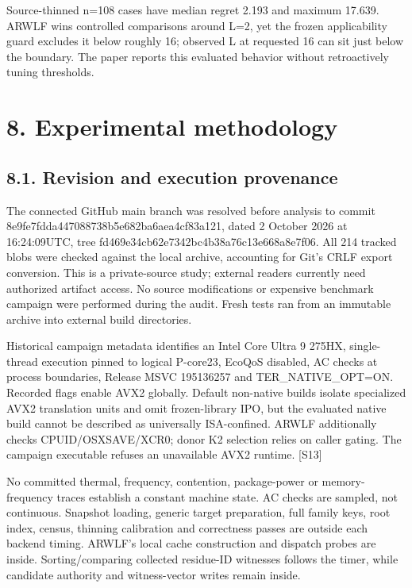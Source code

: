 \documentclass[10pt,letterpaper]{article}
\begin{document}
Source-thinned n=108 cases have median regret 2.193 and maximum 17.639. ARWLF wins controlled comparisons around L=2, yet the frozen applicability guard excludes it below roughly 16; observed L at requested 16 can sit just below the boundary. The paper reports this evaluated behavior without retroactively tuning thresholds.


\section*{8. Experimental methodology}

\subsection*{8.1. Revision and execution provenance}

The connected GitHub main branch was resolved before analysis to commit 8e9fe7fdda447088738b5e682ba6aea4cf83a121, dated 2 October 2026 at 16:24:09UTC, tree fd469e34cb62e7342bc4b38a76c13e668a8e7f06. All 214 tracked blobs were checked against the local archive, accounting for Git's CRLF export conversion. This is a private-source study; external readers currently need authorized artifact access. No source modifications or expensive benchmark campaign were performed during the audit. Fresh tests ran from an immutable archive into external build directories.


Historical campaign metadata identifies an Intel Core Ultra 9 275HX, single-thread execution pinned to logical P-core23, EcoQoS disabled, AC checks at process boundaries, Release MSVC 195136257 and TER\_NATIVE\_OPT=ON. Recorded flags enable AVX2 globally. Default non-native builds isolate specialized AVX2 translation units and omit frozen-library IPO, but the evaluated native build cannot be described as universally ISA-confined. ARWLF additionally checks CPUID/OSXSAVE/XCR0; donor K2 selection relies on caller gating. The campaign executable refuses an unavailable AVX2 runtime. [S13]


No committed thermal, frequency, contention, package-power or memory-frequency traces establish a constant machine state. AC checks are sampled, not continuous. Snapshot loading, generic target preparation, full family keys, root index, census, thinning calibration and correctness passes are outside each backend timing. ARWLF's local cache construction and dispatch probes are inside. Sorting/comparing collected residue-ID witnesses follows the timer, while candidate authority and witness-vector writes remain inside.
\end{document}
